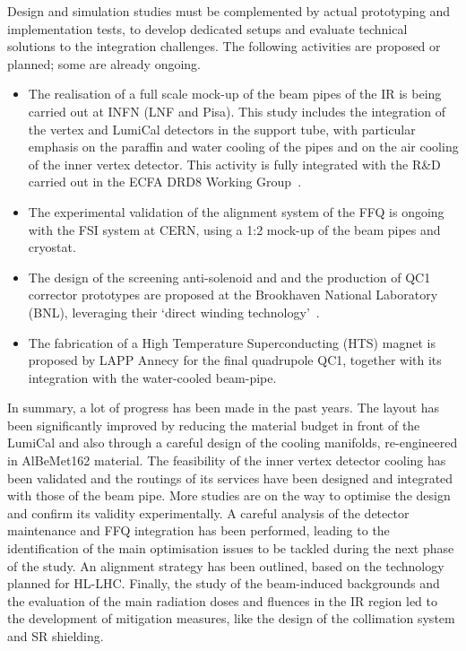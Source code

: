 Design and simulation studies must be complemented by actual prototyping and implementation tests, 
to develop dedicated setups and evaluate technical solutions to the integration challenges. 
The following activities are proposed or planned; some are already ongoing.

\begin{itemize}
    
\item The realisation of a full scale mock-up of the beam pipes of the IR is being carried out at INFN (LNF and Pisa). 
This study includes the integration of the vertex and LumiCal detectors in the support tube, 
with particular emphasis on the paraffin and water cooling of the pipes and on the air cooling of the inner vertex detector. 
This activity is fully integrated with the R\&D carried out in the ECFA DRD8 Working Group~\cite{DRD8}.

\item The experimental validation of the alignment system of the FFQ is ongoing with the FSI system at CERN, 
using a 1:2 mock-up of the beam pipes and cryostat.

\item The design of the screening anti-solenoid and
and the production of QC1 corrector prototypes 
are proposed at the Brookhaven National Laboratory (BNL), 
leveraging their `direct winding technology'~\cite{Parker:2012pla}.

\item The fabrication of a High Temperature Superconducting (HTS) magnet is proposed by LAPP Annecy for the final quadrupole QC1, 
together with its integration with the water-cooled beam-pipe.

\end{itemize}

In summary, a lot of progress has been made in the past years. 
The layout has been significantly improved by reducing the material budget in front of the LumiCal 
and also through a careful design of the cooling manifolds, re-engineered in AlBeMet162 material. 
The feasibility of the inner vertex detector cooling has been validated 
and the routings of its services have been designed and integrated with those of the beam pipe.
More studies are on the way to optimise the design and confirm its validity experimentally. 
A careful analysis of the detector maintenance and FFQ integration has been performed, 
leading to the identification of the main optimisation issues to be tackled during the next phase of the study. 
An alignment strategy has been outlined, based on the technology planned for HL-LHC. 
Finally, the study of the beam-induced backgrounds and the evaluation of the main radiation doses and fluences in the IR region 
led to the development of mitigation measures, like the design of the collimation system and SR shielding.

